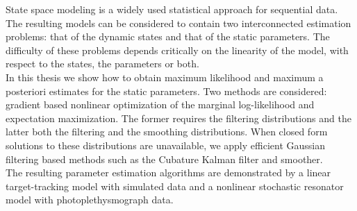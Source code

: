 
\begin{abstractpage}[english]
State space modeling is a widely used statistical approach
for sequential data. The resulting models can be considered to contain
two interconnected estimation problems: that of the dynamic states
and that of the static parameters. The difficulty of these problems
depends critically on the linearity of the model, with
respect to the states, the parameters or both.\\

In this thesis we show how to obtain maximum likelihood and maximum a posteriori
estimates for the static parameters. Two methods are considered: 
gradient based nonlinear
optimization of the marginal log-likelihood and expectation maximization.
The former requires the filtering distributions and the latter both the
filtering and the smoothing distributions.
When closed form solutions to these distributions are unavailable, 
we apply efficient Gaussian filtering based methods
such as the Cubature Kalman filter and smoother.\\

The resulting parameter estimation algorithms 
are demonstrated by a linear target-tracking model
with simulated data and a nonlinear stochastic resonator 
model with photoplethysmograph data. 


\end{abstractpage}

\newpage

